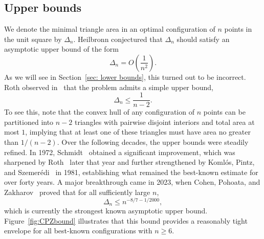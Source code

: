 \documentclass[11pt,a4paper]{article}
\theoremstyle{plain}
\theoremstyle{definition}
\theoremstyle{remark}
\begin{document}
\subsection{Upper bounds}

We denote the minimal triangle area in an optimal configuration of $n$ points in the unit square by $\Delta_n$.
Heilbronn conjectured that $\Delta_n$ should satisfy an asymptotic upper bound of the form
\[
\Delta_n = O\!\left(\frac{1}{n^2}\right).
\]
As we will see in Section~\ref{sec: lower bounds}, this turned out to be incorrect.
Roth observed in~\cite{Roth1951} that the problem admits a simple upper bound,
\[
\Delta_n \le \frac{1}{n-2}.
\]
To see this, note that the convex hull of any configuration of $n$ points can be partitioned into $n-2$ triangles with pairwise disjoint interiors and total area at most $1$, implying that at least one of these triangles must have area no greater than $1/(n-2)$.
Over the following decades, the upper bounds were steadily refined. In 1972, Schmidt~\cite{Schmidt1972} obtained a significant improvement, which was sharpened by Roth~\cite{Roth1972II,Roth1972III} later that year and further strengthened by Koml\'os, Pintz, and Szemer\'edi~\cite{KPS1981} in 1981, establishing what remained the best-known estimate for over forty years.
A major breakthrough came in 2023, when Cohen, Pohoata, and Zakharov~\cite{CPZ2023} proved that for all sufficiently large $n$,
\[
\Delta_n \le n^{-8/7 - 1/2000},
\]
which is currently the strongest known asymptotic upper bound. Figure~\ref{fig:CPZbound} illustrates that this bound provides a reasonably tight envelope for all best-known configurations with $n \ge 6$.
\end{document}
